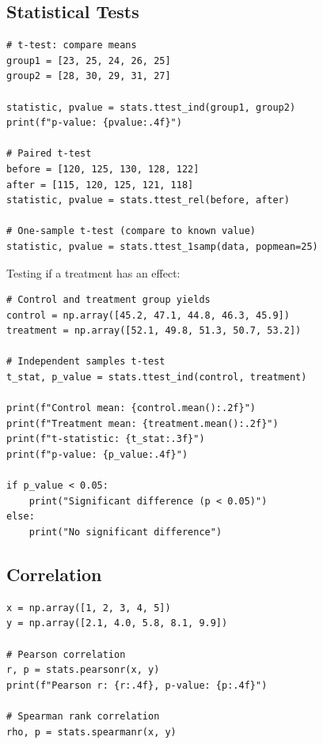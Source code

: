 \subsection{Statistical Tests}

\begin{lstlisting}
# t-test: compare means
group1 = [23, 25, 24, 26, 25]
group2 = [28, 30, 29, 31, 27]

statistic, pvalue = stats.ttest_ind(group1, group2)
print(f"p-value: {pvalue:.4f}")

# Paired t-test
before = [120, 125, 130, 128, 122]
after = [115, 120, 125, 121, 118]
statistic, pvalue = stats.ttest_rel(before, after)

# One-sample t-test (compare to known value)
statistic, pvalue = stats.ttest_1samp(data, popmean=25)
\end{lstlisting}

\begin{labexample}
Testing if a treatment has an effect:

\begin{lstlisting}
# Control and treatment group yields
control = np.array([45.2, 47.1, 44.8, 46.3, 45.9])
treatment = np.array([52.1, 49.8, 51.3, 50.7, 53.2])

# Independent samples t-test
t_stat, p_value = stats.ttest_ind(control, treatment)

print(f"Control mean: {control.mean():.2f}")
print(f"Treatment mean: {treatment.mean():.2f}")
print(f"t-statistic: {t_stat:.3f}")
print(f"p-value: {p_value:.4f}")

if p_value < 0.05:
    print("Significant difference (p < 0.05)")
else:
    print("No significant difference")
\end{lstlisting}
\end{labexample}

\subsection{Correlation}

\begin{lstlisting}
x = np.array([1, 2, 3, 4, 5])
y = np.array([2.1, 4.0, 5.8, 8.1, 9.9])

# Pearson correlation
r, p = stats.pearsonr(x, y)
print(f"Pearson r: {r:.4f}, p-value: {p:.4f}")

# Spearman rank correlation
rho, p = stats.spearmanr(x, y)
\end{lstlisting}

